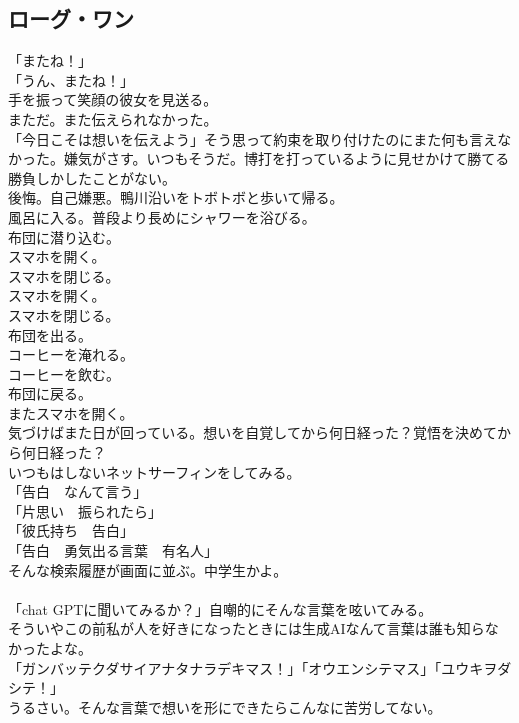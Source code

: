\begin{myboxnote}
\subsection{ローグ・ワン}

\noindent
「またね！」\\
「うん、またね！」\\
手を振って笑顔の彼女を見送る。\\
まただ。また伝えられなかった。\\
「今日こそは想いを伝えよう」そう思って約束を取り付けたのにまた何も言えなかった。嫌気がさす。いつもそうだ。博打を打っているように見せかけて勝てる勝負しかしたことがない。\\
後悔。自己嫌悪。鴨川沿いをトボトボと歩いて帰る。\\
風呂に入る。普段より長めにシャワーを浴びる。\\
布団に潜り込む。\\
スマホを開く。\\
スマホを閉じる。\\
スマホを開く。\\
スマホを閉じる。\\
布団を出る。\\
コーヒーを淹れる。\\
コーヒーを飲む。\\
布団に戻る。\\
またスマホを開く。\\
気づけばまた日が回っている。想いを自覚してから何日経った？覚悟を決めてから何日経った？\\
いつもはしないネットサーフィンをしてみる。\\
「告白　なんて言う」\\
「片思い　振られたら」\\
「彼氏持ち　告白」\\
「告白　勇気出る言葉　有名人」\\
そんな検索履歴が画面に並ぶ。中学生かよ。\\
　\\
「chat GPTに聞いてみるか？」自嘲的にそんな言葉を呟いてみる。\\
そういやこの前私が人を好きになったときには生成AIなんて言葉は誰も知らなかったよな。\\
「ガンバッテクダサイアナタナラデキマス！」「オウエンシテマス」「ユウキヲダシテ！」\\
うるさい。そんな言葉で想いを形にできたらこんなに苦労してない。\\
　\\

\end{myboxnote}
